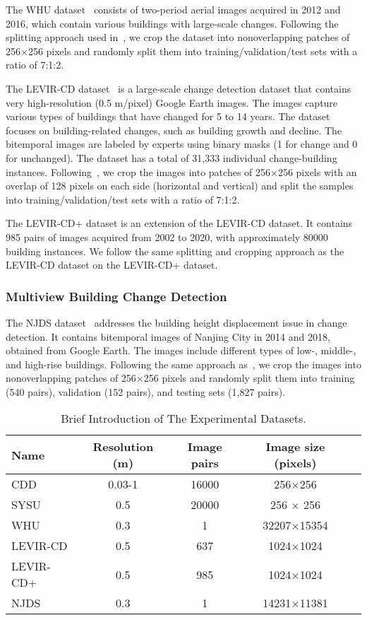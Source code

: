 \documentclass[journal]{IEEEtran}
\begin{document}
The WHU dataset~\cite{whu} consists of two-period aerial images acquired in 2012 and 2016, which contain various buildings with large-scale changes. Following the splitting approach used in~\cite{orsi}, we crop the dataset into nonoverlapping patches of 256×256 pixels and randomly split them into training/validation/test sets with a ratio of 7:1:2.

The LEVIR-CD dataset~\cite{sta} is a large-scale change detection dataset that contains very high-resolution (0.5 m/pixel) Google Earth images. The images capture various types of buildings that have changed for 5 to 14 years. The dataset focuses on building-related changes, such as building growth and decline. The bitemporal images are labeled by experts using binary masks (1 for change and 0 for unchanged). The dataset has a total of 31,333 individual change-building instances. Following~\cite{fccdn}, we crop the images into patches of 256×256 pixels with an overlap of 128 pixels on each side (horizontal and vertical) and split the samples into training/validation/test sets with a ratio of 7:1:2.

The LEVIR-CD+ dataset is an extension of the LEVIR-CD dataset. It contains 985 pairs of images acquired from 2002 to 2020, with approximately 80000 building instances. We follow the same splitting and cropping approach as the LEVIR-CD dataset on the LEVIR-CD+ dataset.

\subsubsection{Multiview Building Change Detection}

The NJDS dataset~\cite{njds} addresses the building height displacement issue in change detection. It contains bitemporal images of Nanjing City in 2014 and 2018, obtained from Google Earth. The images include different types of low-, middle-, and high-rise buildings. Following the same approach as~\cite{njds}, we crop the images into nonoverlapping patches of 256×256 pixels and randomly split them into training (540 pairs), validation (152 pairs), and testing sets (1,827 pairs).

\begin{table}[!ht]
\caption{Brief Introduction of The Experimental Datasets.}
\label{datasets_introduction}
\centering
\begin{tabular}{lcccc}
\toprule
Name & Resolution (m) & Image pairs & Image size (pixels) \\
\midrule
CDD & 0.03-1 & 16000 & 256×256 \\
SYSU & 0.5 & 20000 & 256 × 256 \\
WHU & 0.3 & 1 & 32207×15354 \\
LEVIR-CD & 0.5 & 637 & 1024×1024 \\
LEVIR-CD+ & 0.5 & 985 & 1024×1024 \\
NJDS & 0.3 & 1 & 14231×11381 \\
\bottomrule
\end{tabular}
\end{table}
\end{document}
